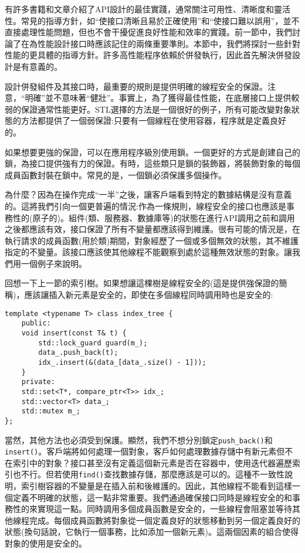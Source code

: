 
有許多書籍和文章介紹了API設計的最佳實踐，通常關注可用性、清晰度和靈活性。常見的指導方針，如“使接口清晰且易於正確使用”和“使接口難以誤用”，並不直接處理性能問題，但也不會干擾促進良好性能和效率的實踐。前一節中，我們討論了在為性能設計接口時應該記住的兩條重要準則。本節中，我們將探討一些針對性能的更具體的指導方針。許多高性能程序依賴於併發執行，因此首先解決併發設計是有意義的。


設計併發組件及其接口時，最重要的規則是提供明確的線程安全的保證。注意，“明確”並不意味著“健壯”。事實上，為了獲得最佳性能，在底層接口上提供較弱的保證通常性能更好。STL選擇的方法是一個很好的例子，所有可能改變對象狀態的方法都提供了一個弱保證:只要有一個線程在使用容器，程序就是定義良好的。 

如果想要更強的保證，可以在應用程序級別使用鎖。一個更好的方式是創建自己的鎖，為接口提供強有力的保證。有時，這些類只是鎖的裝飾器，將裝飾對象的每個成員函數封裝在鎖中。常見的是，一個鎖必須保護多個操作。

為什麼？因為在操作完成“一半”之後，讓客戶端看到特定的數據結構是沒有意義的。這將我們引向一個更普遍的情況:作為一條規則，線程安全的接口也應該是事務性的(原子的)。組件(類、服務器、數據庫等)的狀態在進行API調用之前和調用之後都應該有效，接口保證了所有不變量都應該得到維護。很有可能的情況是，在執行請求的成員函數(用於類)期間，對象經歷了一個或多個無效的狀態，其不維護指定的不變量。該接口應該使其他線程不能觀察到處於這種無效狀態的對象。讓我們用一個例子來說明。

回想一下上一節的索引樹。如果想讓這棵樹是線程安全的(這是提供強保證的簡稱)，應該讓插入新元素是安全的，即使在多個線程同時調用時也是安全的:

\begin{lstlisting}[style=styleCXX]
template <typename T> class index_tree {
	public:
	void insert(const T& t) {
		std::lock_guard guard(m_);
		data_.push_back(t);
		idx_.insert(&(data_[data_.size() - 1]));
	}
	private:
	std::set<T*, compare_ptr<T>> idx_;
	std::vector<T> data_;
	std::mutex m_;
};

\end{lstlisting}

當然，其他方法也必須受到保護。顯然，我們不想分別鎖定\texttt{push\_back()}和\texttt{insert()}。客戶端將如何處理一個對象，客戶如何處理數據存儲中有新元素但不在索引中的對象？接口甚至沒有定義這個新元素是否在容器中，使用迭代器遍歷索引也不行。但若使用\texttt{find()}查找數據存儲，那麼應該是可以的。這種不一致性說明，索引樹容器的不變量是在插入前和後維護的。因此，其他線程不能看到這樣一個定義不明確的狀態，這一點非常重要。我們通過確保接口同時是線程安全的和事務性的來實現這一點。同時調用多個成員函數是安全的，一些線程會阻塞並等待其他線程完成。每個成員函數將對象從一個定義良好的狀態移動到另一個定義良好的狀態(換句話說，它執行一個事務，比如添加一個新元素)。這兩個因素的組合使得對象的使用是安全的。

